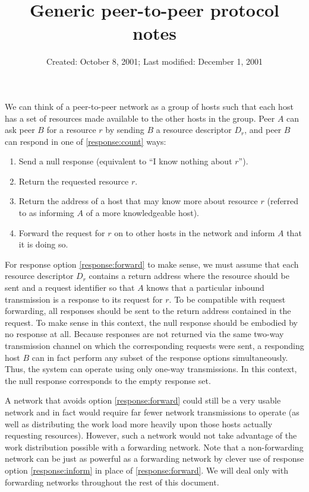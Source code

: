 \documentclass[12pt]{article}
\begin{document}
\title{Generic peer-to-peer protocol notes}
\date{Created: October 8, 2001;  Last modified: December 1, 2001}

\maketitle

We can think of a peer-to-peer network as a group of hosts such that each host has a set of resources made available to the other hosts in the group.  Peer $A$ can ask peer $B$ for a resource $r$ by sending $B$ a resource descriptor $D_r$, and peer $B$ can respond in one of \ref{response:count} ways:
\begin{enumerate}
\item Send a null response (equivalent to ``I know nothing about $r$'').
\item Return the requested resource $r$.
\item Return the address of a host that may know more about resource $r$ (referred to as informing $A$ of a more knowledgeable host). \label{response:inform}
\item Forward the request for $r$ on to other hosts in the network and inform $A$ that it is doing so.\label{response:forward}
\label{response:count}
\end{enumerate}
For response option \ref{response:forward} to make sense, we must assume that each resource descriptor $D_r$ contains a return address where the resource should be sent and a request identifier so that $A$ knows that a particular inbound transmission is a response to its request for $r$.  To be compatible with request forwarding, all responses should be sent to the return address contained in the request.  To make sense in this context, the null response should be embodied by no response at all.  Because responses are not returned via the same two-way transmission channel on which the corresponding requests were sent, a responding host $B$ can in fact perform any subset of the response options simultaneously.  Thus, the system can operate using only one-way transmissions.  In this context, the null response corresponds to the empty response set.

A network that avoids option \ref{response:forward} could still be a very usable network and in fact would require far fewer network transmissions to operate (as well as distributing the work load more heavily upon those hosts actually requesting resources).  However, such a network would not take advantage of the work distribution possible with a forwarding network.  Note that a non-forwarding network can be just as powerful as a forwarding network by clever use of response option \ref{response:inform} in place of \ref{response:forward}.  We will deal only with forwarding networks throughout the rest of this document.
\end{document}
